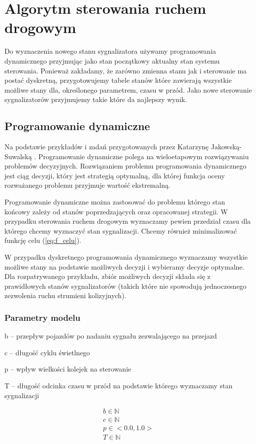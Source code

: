 \chapter{Algorytm sterowania ruchem drogowym}
Do wyznaczenia nowego stanu sygnalizatora używamy programowania dynamicznego przyjmując jako stan początkowy aktualny stan systemu sterowania. Ponieważ zakładamy, że zarówno zmienna stanu jak i sterowanie ma postać dyskretną, przygotowujemy tabele stanów które zawierają wszystkie możliwe stany dla, określonego parametrem, czasu w przód. Jako nowe sterowanie sygnalizatorów przyjmujemy takie które da najlepszy wynik.

\section{Programowanie dynamiczne}
Na podstawie przykładów i zadań przygotowanych przez Katarzynę Jakowską-Suwalską \cite{jakowska-suwalska}.
Programowanie dynamiczne polega na wieloetapowym rozwiązywaniu problemów decyzyjnych. Rozwiązaniem problemu programowania dynamicznego jest ciąg decyzji, który jest strategią optymalną, dla której funkcja oceny rozważanego problemu przyjmuje wartość ekstremalną.

Programowanie dynamiczne można zastosować do problemu którego stan końcowy zależy od stanów poprzedzających oraz opracowanej strategii. W przypadku sterowania ruchem drogowym wyznaczamy pewien przedział czasu dla którego chcemy wyznaczyć stan sygnalizacji. Chcemy również minimalizować funkcję celu (\ref{eq:f_celu}).

W przypadku dyskretnego programowania dynamicznego wyznaczamy wszystkie możliwe stany na podstawie możliwych decyzji i wybieramy decyzje optymalne. Dla rozpatrywanego przykładu, zbiór możliwych decyzji składa się z prawidłowych stanów sygnalizatorów (takich które nie spowodują jednoczesnego zezwolenia ruchu strumieni kolizyjnych).

\subsection{Parametry modelu}
b -- przepływ pojazdów po nadaniu sygnału zezwalającego na przejazd

c -- długość cyklu świetlnego

p -- wpływ wielkości kolejek na sterowanie

T -- długość odcinka czasu w przód na podstawie którego wyznaczamy stan sygnalizacji

\begin{equation}
	\begin{array}{c}
		b \in \mathbb{N}\\
		c \in \mathbb{N}\\
		p \in <0.0, 1.0>\\
		T \in \mathbb{N}
	\end{array}
\end{equation}

